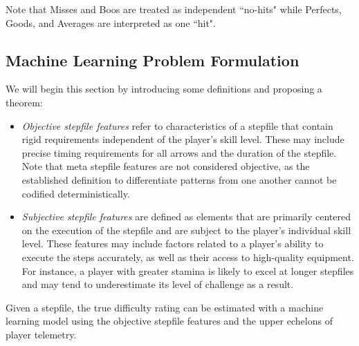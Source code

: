Note that Misses and Boos are treated as independent ``no-hits" while Perfects, Goods, and Averages are interpreted as one ``hit". 



\subsection{Machine Learning Problem Formulation}

We will begin this section by introducing some definitions and proposing a theorem:

\begin{itemize}
    \item \textit{Objective stepfile features} refer to characteristics of a stepfile that contain rigid requirements independent of the player's skill level. These may include precise timing requirements for all arrows and the duration of the stepfile. Note that meta stepfile features are not considered objective, as the established definition to differentiate patterns from one another cannot be codified deterministically. 
    \item \textit{Subjective stepfile features} are defined as elements that are primarily centered on the execution of the stepfile and are subject to the player's individual skill level. These features may include factors related to a player's ability to execute the steps accurately, as well as their access to high-quality equipment. For instance, a player with greater stamina is likely to excel at longer stepfiles and may tend to underestimate its level of challenge as a result. 
\end{itemize}

\begin{theorem}
Given a stepfile, the true difficulty rating can be estimated with a machine learning model using the objective stepfile features and the upper echelons of player telemetry.
\end{theorem}

